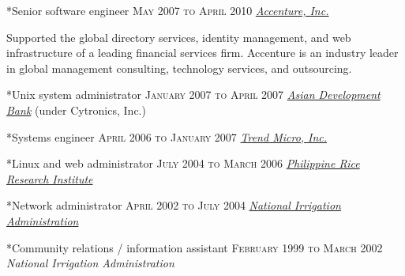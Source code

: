\documentclass[10pt, a4paper, final]{article}
\begin{document}
\begin{minipage}[t]{0.65\linewidth}
\begin{section}
    \begin{subsection}*{Senior software engineer \hfill\textsc{May 2007 to April 2010}}
      \href{http://www.accenture.com}{\textit{Accenture, Inc.}}  

      Supported the global directory services, identity management, and web infrastructure of a leading financial services firm. Accenture is an industry leader in global management consulting, technology services, and outsourcing.
    \end{subsection}
    \vspace{1em}
  
    \begin{subsection}*{Unix system administrator \hfill\textsc{January 2007 to April 2007}}
      \href{http://www.adb.org}{\textit{Asian Development Bank}} (under Cytronics, Inc.) 
    \end{subsection}
    \vspace{1em}
  
    \begin{subsection}*{Systems engineer \hfill\textsc{April 2006 to January 2007}}
      \href{http://www.trendmicro.com}{\textit{Trend Micro, Inc.}}  
    \end{subsection}
    \vspace{1em}
  
    \begin{subsection}*{Linux and web administrator \hfill\textsc{July 2004 to March 2006}}
      \href{http://www.philrice.gov.ph}{\textit{Philippine Rice Research Institute}}  
    \end{subsection}
    \vspace{1em}
  
    \begin{subsection}*{Network administrator \hfill\textsc{April 2002 to July 2004}}
      \href{http://www.nia.gov.ph}{\textit{National Irrigation Administration}}  
    \end{subsection}
    \vspace{1em}
  
    \begin{subsection}*{Community relations / information assistant \hfill\textsc{February 1999 to March 2002}}
      \textit{National Irrigation Administration} 
    \end{subsection}
    \vspace{1em}
  \end{section}
\end{minipage}
\end{document}
